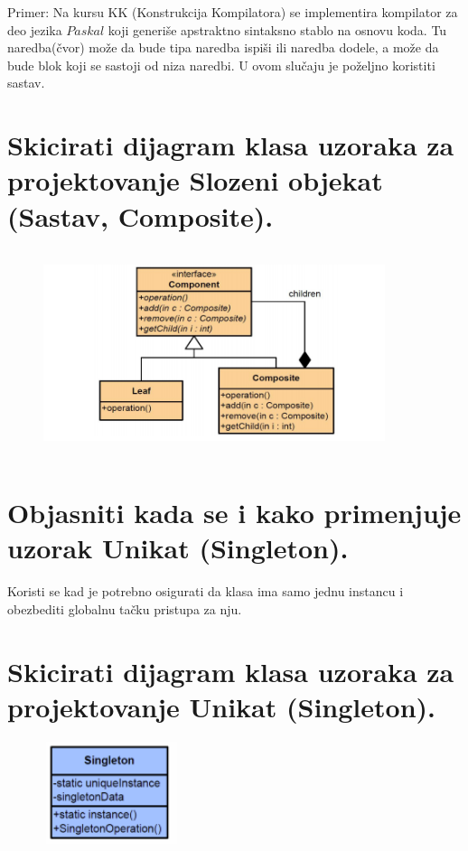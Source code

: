 \documentclass[a4paper]{article}
\begin{document}
  Primer: Na kursu KK (Konstrukcija Kompilatora) se implementira kompilator 
  za deo jezika $Paskal$ koji generiše apstraktno sintaksno stablo na osnovu koda. Tu naredba(čvor) 
  može da bude tipa naredba ispiši ili naredba dodele, a može da bude blok koji 
  se sastoji od niza naredbi. U ovom slučaju je poželjno koristiti sastav. 

\section{Skicirati dijagram klasa uzoraka za projektovanje Slozeni objekat (Sastav, Composite).}
  \begin{figure}[H]
    \begin{center}
        \includegraphics[width=100mm,height=60mm]{Slike/dp_composite.png}
    \end{center}
  \end{figure}   

\section{Objasniti kada se i kako primenjuje uzorak Unikat (Singleton).}
  Koristi se kad je potrebno osigurati da klasa ima samo jednu instancu i obezbediti globalnu 
  tačku pristupa za nju.

\section{Skicirati dijagram klasa uzoraka za projektovanje Unikat (Singleton).}
  \begin{figure}[H]
    \begin{center}
        \includegraphics[width=40mm,height=30mm]{Slike/dp_singleton.png}
    \end{center}
  \end{figure}  
\end{document}
